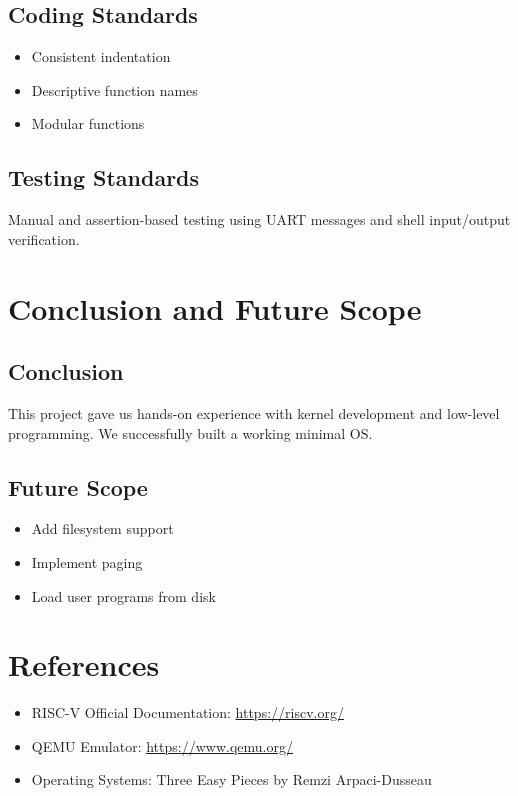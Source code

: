 \documentclass[a4paper,12pt]{report}
\begin{document}
\section{Coding Standards}
\begin{itemize}
    \item Consistent indentation
    \item Descriptive function names
    \item Modular functions
\end{itemize}

\section{Testing Standards}
Manual and assertion-based testing using UART messages and shell input/output verification.

\chapter{Conclusion and Future Scope}
\section{Conclusion}
This project gave us hands-on experience with kernel development and low-level programming. We successfully built a working minimal OS.

\section{Future Scope}
\begin{itemize}
    \item Add filesystem support
    \item Implement paging
    \item Load user programs from disk
\end{itemize}

\chapter*{References}
\begin{itemize}
    \item RISC-V Official Documentation: \url{https://riscv.org/}
    \item QEMU Emulator: \url{https://www.qemu.org/}
    \item Operating Systems: Three Easy Pieces by Remzi Arpaci-Dusseau
\end{itemize}
\end{document}
